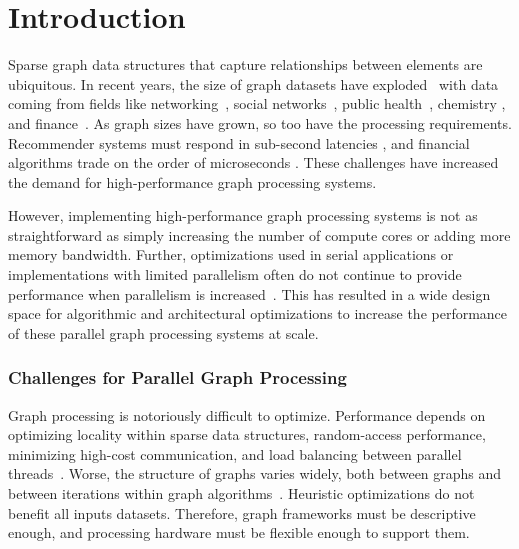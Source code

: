 \chapter{Introduction}\label{gen:sec:intro}



Sparse graph data structures that capture relationships between elements are ubiquitous.
In recent years, the size of graph datasets have exploded~\cite{sahu2017ubiquity} with data coming from fields like networking~\cite{lehmberg2014structure}, social networks~\cite{sharma2016graphjet, eksombatchai2018pixie}, public health~\cite{keeling2005networks, Ulyantsev2016Metafast}, chemistry \cite{tsubaki2019compound}, and finance~\cite{boginski2005finance}. 
As graph sizes have grown, so too have the processing requirements. Recommender systems must respond in sub-second latencies \cite{sharma2016graphjet, eksombatchai2018pixie}, and financial algorithms trade on the order of microseconds \cite{menkveld2018hft}.
These challenges have increased the demand for high-performance graph processing systems.

However, implementing high-performance graph processing systems is not as straightforward as simply increasing the number of compute cores or adding more memory bandwidth. 
Further, optimizations used in serial applications or implementations with limited parallelism often do not continue to provide performance when parallelism is increased~\cite{beamer2015locality}.
This has resulted in a wide design space for algorithmic and architectural optimizations to increase the performance of these parallel graph processing systems at scale.


\subsection{Challenges for Parallel Graph Processing}

Graph processing is notoriously difficult to optimize. 
Performance depends on optimizing locality within sparse data structures, random-access performance, minimizing high-cost communication, and load balancing between parallel threads~\cite{lumsdaine2007challenges, beamer2015locality}. 
Worse, the structure of graphs varies widely, both between graphs and between iterations within graph algorithms~\citep{lumsdaine2007challenges, beamer-bfs-direction}. Heuristic optimizations do not benefit all inputs datasets. 
Therefore, graph frameworks must be descriptive enough, and processing hardware must be flexible enough to support them.

